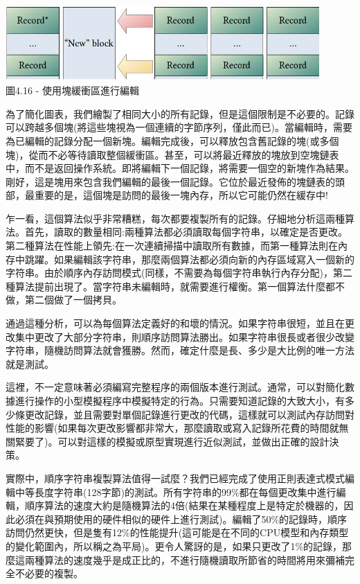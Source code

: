 \begin{center}
\includegraphics[width=0.9\textwidth]{content/1/chapter4/images/16.jpg}\\
圖4.16 - 使用塊緩衝區進行編輯
\end{center}

為了簡化圖表，我們繪製了相同大小的所有記錄，但是這個限制是不必要的。記錄可以跨越多個塊(將這些塊視為一個連續的字節序列，僅此而已)。當編輯時，需要為已編輯的記錄分配一個新塊。編輯完成後，可以釋放包含舊記錄的塊(或多個塊)，從而不必等待讀取整個緩衝區。甚至，可以將最近釋放的塊放到空塊鏈表中，而不是返回操作系統。即將編輯下一個記錄，將需要一個空的新塊作為結果。剛好，這是塊用來包含我們編輯的最後一個記錄。它位於最近發佈的塊鏈表的頭部，最重要的是，這個塊是訪問的最後一塊內存，所以它可能仍然在緩存中!

乍一看，這個算法似乎非常糟糕，每次都要複製所有的記錄。仔細地分析這兩種算法。首先，讀取的數量相同:兩種算法都必須讀取每個字符串，以確定是否更改。第二種算法在性能上領先:在一次連續掃描中讀取所有數據，而第一種算法則在內存中跳躍。如果編輯該字符串，那麼兩個算法都必須向新的內存區域寫入一個新的字符串。由於順序內存訪問模式(同樣，不需要為每個字符串執行內存分配)，第二種算法提前出現了。當字符串未編輯時，就需要進行權衡。第一個算法什麼都不做，第二個做了一個拷貝。

通過這種分析，可以為每個算法定義好的和壞的情況。如果字符串很短，並且在更改集中更改了大部分字符串，則順序訪問算法勝出。如果字符串很長或者很少改變字符串，隨機訪問算法就會獲勝。然而，確定什麼是長、多少是大比例的唯一方法就是測試。

這裡，不一定意味著必須編寫完整程序的兩個版本進行測試。通常，可以對簡化數據進行操作的小型模擬程序中模擬特定的行為。只需要知道記錄的大致大小，有多少條更改記錄，並且需要對單個記錄進行更改的代碼，這樣就可以測試內存訪問對性能的影響(如果每次更改影響都非常大，那麼讀取或寫入記錄所花費的時間就無關緊要了)。可以對這樣的模擬或原型實現進行近似測試，並做出正確的設計決策。

實際中，順序字符串複製算法值得一試麼？我們已經完成了使用正則表達式模式編輯中等長度字符串(128字節)的測試。所有字符串的99\%都在每個更改集中進行編輯，順序算法的速度大約是隨機算法的4倍(結果在某種程度上是特定於機器的，因此必須在與預期使用的硬件相似的硬件上進行測試)。編輯了50\%的記錄時，順序訪問仍然更快，但是隻有12\%的性能提升(這可能是在不同的CPU模型和內存類型的變化範圍內，所以稱之為平局)。更令人驚訝的是，如果只更改了1\%的記錄，那麼這兩種算法的速度幾乎是成正比的，不進行隨機讀取所節省的時間將用來彌補完全不必要的複製。

